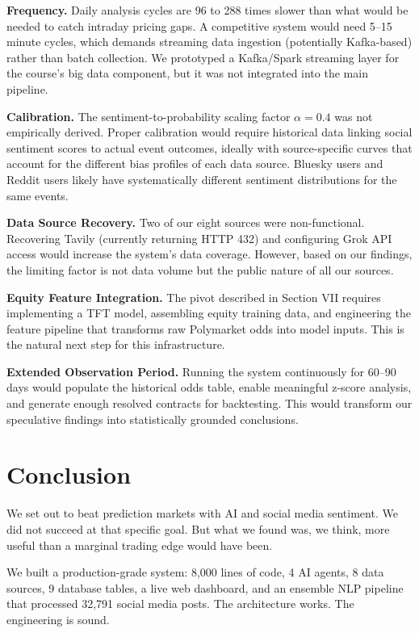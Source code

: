 \documentclass[conference]{IEEEtran}
\begin{document}
\textbf{Frequency.} Daily analysis cycles are 96 to 288 times slower than what would be needed to catch intraday pricing gaps. A competitive system would need 5--15 minute cycles, which demands streaming data ingestion (potentially Kafka-based) rather than batch collection. We prototyped a Kafka/Spark streaming layer for the course's big data component, but it was not integrated into the main pipeline.

\textbf{Calibration.} The sentiment-to-probability scaling factor $\alpha = 0.4$ was not empirically derived. Proper calibration would require historical data linking social sentiment scores to actual event outcomes, ideally with source-specific curves that account for the different bias profiles of each data source. Bluesky users and Reddit users likely have systematically different sentiment distributions for the same events.

\textbf{Data Source Recovery.} Two of our eight sources were non-functional. Recovering Tavily (currently returning HTTP 432) and configuring Grok API access would increase the system's data coverage. However, based on our findings, the limiting factor is not data volume but the public nature of all our sources.

\textbf{Equity Feature Integration.} The pivot described in Section VII requires implementing a TFT model, assembling equity training data, and engineering the feature pipeline that transforms raw Polymarket odds into model inputs. This is the natural next step for this infrastructure.

\textbf{Extended Observation Period.} Running the system continuously for 60--90 days would populate the historical odds table, enable meaningful z-score analysis, and generate enough resolved contracts for backtesting. This would transform our speculative findings into statistically grounded conclusions.

\section{Conclusion}

We set out to beat prediction markets with AI and social media sentiment. We did not succeed at that specific goal. But what we found was, we think, more useful than a marginal trading edge would have been.

We built a production-grade system: 8,000 lines of code, 4 AI agents, 8 data sources, 9 database tables, a live web dashboard, and an ensemble NLP pipeline that processed 32,791 social media posts. The architecture works. The engineering is sound.
\end{document}
